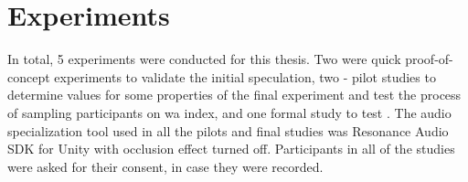 
\chapter{Experiments}

In total, 5 experiments were conducted for this thesis. Two were quick proof-of-concept experiments to validate the initial speculation, two - pilot studies to determine values for some properties of the final experiment and test the process of sampling participants on \gls{wa} index, and one formal study to test . 
The audio specialization tool used in all the pilots and final studies was Resonance Audio SDK for Unity with occlusion effect turned off.
Participants in all of the studies were asked for their consent, in case they were recorded.



